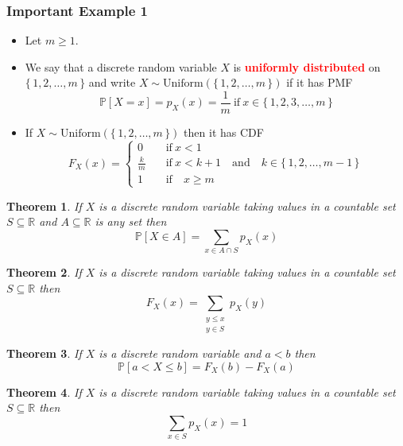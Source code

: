\documentclass{article}
\newcommand{\PP}{\mathbb{P}}
\newcommand{\R}{\mathbb{R}}
\newcommand{\bfred}[1]{\textcolor{red}{\textbf{#1}}}
\theoremstyle{plain}
\newtheorem{thm}{Theorem}[section]
\theoremstyle{definition}
\theoremstyle{remark}
\begin{document}
\subsubsection*{Important Example 1}

\begin{tcolorbox}[title = Uniform Distribution, colback = SkyBlue!5!white,colframe = SkyBlue!75!black]
    \begin{itemize}
        \item Let $m \geq 1$.
        \item We say that a discrete random variable $X$ is \bfred{uniformly distributed} on $\{\, 1, 2, \dotsc, m \,\}$ and write $X \sim \text{Uniform}(\{\, 1, 2, \dotsc, m \,\})$ if it has PMF \[\PP[X=x] = p_X(x) = \frac{1}{m} \ \text{if} \ x \in \{\,1, 2, 3, \dotsc, m\,\}\]
        \item If $X \sim \text{Uniform}(\{\, 1, 2, \dotsc, m \,\})$ then it has CDF \[F_X(x) =
        \begin{cases}
            0 \quad &\text{if} \ x < 1 \\
            \frac{k}{m} \quad &\text{if} \ x < k + 1 \quad \text{and} \quad k \in \{\,1, 2, \dotsc, m-1\,\} \\
            1 \quad &\text{if} \quad x \geq m
        \end{cases}\]
    \end{itemize}
\end{tcolorbox}

\begin{thm}
    If $X$ is a discrete random variable taking values in a countable set $S \subseteq \R$ and $A \subseteq \R$ is any set then \[\PP[X \in A] = \sum_{x \in A \cap S}p_X(x)\]
\end{thm}

\begin{thm}
    If $X$ is a discrete random variable taking values in a countable set $S \subseteq \R$ then \[F_X(x) = \sum_{\substack{y \leq x \\ y \in S}} p_X(y)\]
\end{thm}

\begin{thm}
    If $X$ is a discrete random variable and $a < b$ then \[\PP[a < X \leq b] = F_X(b) - F_X(a)\]
\end{thm}

\begin{thm}
    If $X$ is a discrete random variable taking values in a countable set $S \subseteq \R$ then \[\sum_{x \in S} p_X(x) = 1\]
\end{thm}
\end{document}
